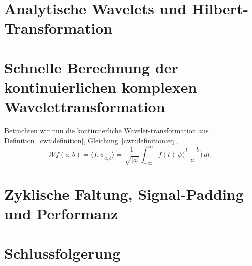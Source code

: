 \begin{refsection}


\section{Analytische Wavelets und Hilbert-Transformation}




\section{Schnelle Berechnung der kontinuierlichen komplexen Wavelettransformation}

Betrachten wir nun die kontinuierliche Wavelet-transformation aus Definition~\ref{cwt:definition}, Gleichung~\eqref{cwt:definition:eq},
\[
\mathcal{W}f (a,b)
=
\langle f,\psi_{a,b}\rangle
=
\frac{1}{\sqrt{|a|}}\int_{-\infty}^\infty f(t)\,\overline{
	\psi\biggl(\frac{t-b}{a}\biggr)}\,dt.
\]


\section{Zyklische Faltung, Signal-Padding und Performanz}

\section{Schlussfolgerung}

\printbibliography[heading=subbibliography]
\end{refsection}
